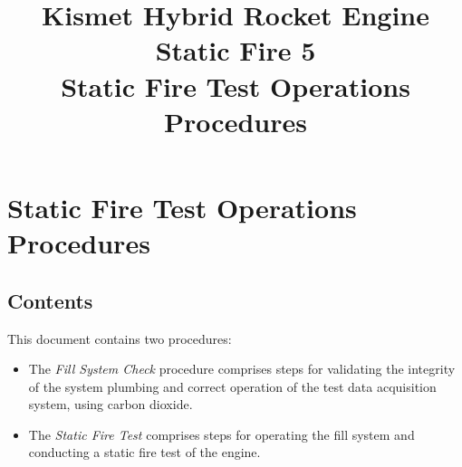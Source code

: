 

\title{\Huge Kismet Hybrid Rocket Engine\\
Static Fire 5\\
\vspace{1cm}
\Large Static Fire Test Operations Procedures}





\section{Static Fire Test Operations Procedures}

\subsection{Contents}
This document contains two procedures:
\begin{itemize}
	\item The \textit{Fill System Check} procedure comprises steps for validating the integrity of the system plumbing and correct operation of the test data acquisition system, using carbon dioxide.
	\item The \textit{Static Fire Test} comprises steps for operating the fill system and conducting a static fire test of the engine. 
\end{itemize}


